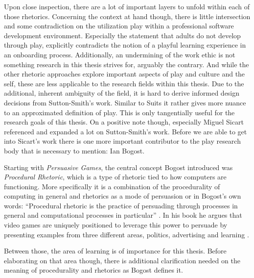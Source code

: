 Upon close inspection, there are a lot of important layers to unfold within each of those rhetorics. Concerning the context at hand though, there is little intersection and some contradiction on the utilization play within a professional software development environment. Especially the statement that adults do not develop through play, explicitly contradicts the notion of a playful learning experience in an onboarding process. Additionally, an undermining of the work ethic is not something research in this thesis strives for, arguably the contrary. And while the other rhetoric approaches explore important aspects of play and culture and the self, these are less applicable to the research fields within this thesis. Due to the additional, inherent ambiguity of the field, it is hard to derive informed design decisions from Sutton-Smith's work. Similar to Suits it rather gives more nuance to an approximated definition of play. This is only tangentially useful for the research goals of this thesis. On a positive note though, especially Miguel Sicart referenced and expanded a lot on Sutton-Smith's work. Before we are able to get into Sicart's work there is one more important contributor to the play research body that is necessary to mention: Ian Bogost.

Starting with \textit{Persuasive Games}, the central concept Bogost introduced was \textit{Procedural Rhetoric}, which is a type of rhetoric tied to how computers are functioning. More specifically it is a combination of the procedurality of computing in general and rhetorics as a mode of persuasion or in Bogost's own words: \enquote{Procedural rhetoric is the practice of persuading through processes in general and computational processes in particular} \cite[p. 3]{bogost2007persuasive}. In his book he argues that video games are uniquely positioned to leverage this power to persuade by presenting examples from three different areas, politics, advertising and learning \cite{bogost2007persuasive}.

Between those, the area of learning is of importance for this thesis. Before elaborating on that area though, there is additional clarification needed on the meaning of procedurality and rhetorics as Bogost defines it.

